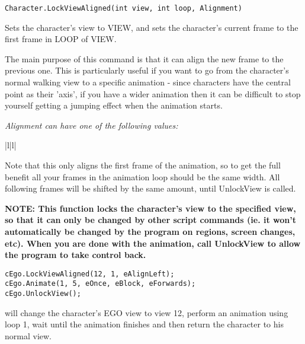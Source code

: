 \begin{verbatim}
Character.LockViewAligned(int view, int loop, Alignment)
\end{verbatim}

Sets the character's view to VIEW, and sets the character's current frame to
the first frame in LOOP of VIEW.

The main purpose of this command is that it can align the new frame to the previous one.
This is particularly useful if you want to go from the character's normal walking view to
a specific animation - since characters have the central point as their 'axis', if
you have a wider animation then it can be difficult to stop yourself getting a jumping
effect when the animation starts.

\it{Alignment} can have one of the following values:

\begin{tabular}{|l|l|}
\end{tabular}

Note that this only aligns the first frame of the animation, so to get the full benefit
all your frames in the animation loop should be the same width. All following frames will
be shifted by the same amount, until UnlockView is called.

\bf{NOTE:} This function locks the character's view to the specified view, so
that it can only be changed by other script commands (ie. it won't
automatically be changed by the program on regions, screen changes,
etc). When you are done with the animation, call UnlockView to
allow the program to take control back.

\begin{verbatim}
cEgo.LockViewAligned(12, 1, eAlignLeft);
cEgo.Animate(1, 5, eOnce, eBlock, eForwards);
cEgo.UnlockView();
\end{verbatim}
will change the character's EGO view to view 12, perform an animation using loop 1,
wait until the animation finishes and then return the character to his normal view.

